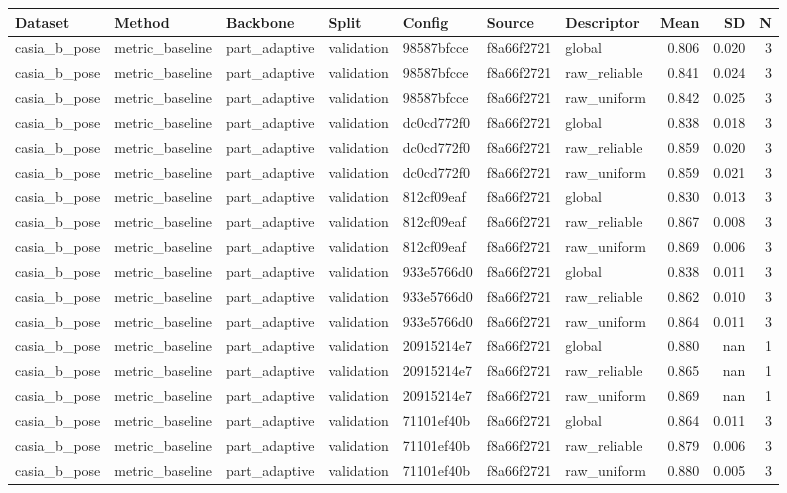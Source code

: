\begin{tabular}{lllllllrrr}
Dataset & Method & Backbone & Split & Config & Source & Descriptor & Mean & SD & N \\
\hline
casia\_b\_pose & metric\_baseline & part\_adaptive & validation & 98587bfcce & f8a66f2721 & global & 0.806 & 0.020 & 3 \\
casia\_b\_pose & metric\_baseline & part\_adaptive & validation & 98587bfcce & f8a66f2721 & raw\_reliable & 0.841 & 0.024 & 3 \\
casia\_b\_pose & metric\_baseline & part\_adaptive & validation & 98587bfcce & f8a66f2721 & raw\_uniform & 0.842 & 0.025 & 3 \\
casia\_b\_pose & metric\_baseline & part\_adaptive & validation & dc0cd772f0 & f8a66f2721 & global & 0.838 & 0.018 & 3 \\
casia\_b\_pose & metric\_baseline & part\_adaptive & validation & dc0cd772f0 & f8a66f2721 & raw\_reliable & 0.859 & 0.020 & 3 \\
casia\_b\_pose & metric\_baseline & part\_adaptive & validation & dc0cd772f0 & f8a66f2721 & raw\_uniform & 0.859 & 0.021 & 3 \\
casia\_b\_pose & metric\_baseline & part\_adaptive & validation & 812cf09eaf & f8a66f2721 & global & 0.830 & 0.013 & 3 \\
casia\_b\_pose & metric\_baseline & part\_adaptive & validation & 812cf09eaf & f8a66f2721 & raw\_reliable & 0.867 & 0.008 & 3 \\
casia\_b\_pose & metric\_baseline & part\_adaptive & validation & 812cf09eaf & f8a66f2721 & raw\_uniform & 0.869 & 0.006 & 3 \\
casia\_b\_pose & metric\_baseline & part\_adaptive & validation & 933e5766d0 & f8a66f2721 & global & 0.838 & 0.011 & 3 \\
casia\_b\_pose & metric\_baseline & part\_adaptive & validation & 933e5766d0 & f8a66f2721 & raw\_reliable & 0.862 & 0.010 & 3 \\
casia\_b\_pose & metric\_baseline & part\_adaptive & validation & 933e5766d0 & f8a66f2721 & raw\_uniform & 0.864 & 0.011 & 3 \\
casia\_b\_pose & metric\_baseline & part\_adaptive & validation & 20915214e7 & f8a66f2721 & global & 0.880 & nan & 1 \\
casia\_b\_pose & metric\_baseline & part\_adaptive & validation & 20915214e7 & f8a66f2721 & raw\_reliable & 0.865 & nan & 1 \\
casia\_b\_pose & metric\_baseline & part\_adaptive & validation & 20915214e7 & f8a66f2721 & raw\_uniform & 0.869 & nan & 1 \\
casia\_b\_pose & metric\_baseline & part\_adaptive & validation & 71101ef40b & f8a66f2721 & global & 0.864 & 0.011 & 3 \\
casia\_b\_pose & metric\_baseline & part\_adaptive & validation & 71101ef40b & f8a66f2721 & raw\_reliable & 0.879 & 0.006 & 3 \\
casia\_b\_pose & metric\_baseline & part\_adaptive & validation & 71101ef40b & f8a66f2721 & raw\_uniform & 0.880 & 0.005 & 3 \\
\end{tabular}
